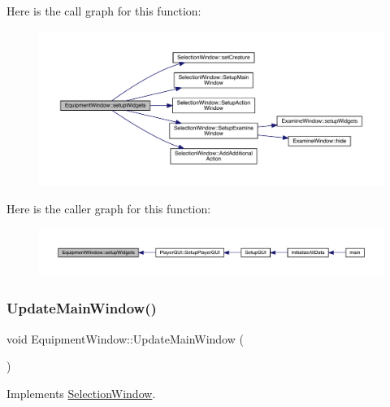 Here is the call graph for this function\+:
\nopagebreak
\begin{figure}[H]
\begin{center}
\leavevmode
\includegraphics[width=350pt]{d8/dcb/class_equipment_window_ad6ac175768f8725534c9b9ca1bd4d79a_cgraph}
\end{center}
\end{figure}
Here is the caller graph for this function\+:
\nopagebreak
\begin{figure}[H]
\begin{center}
\leavevmode
\includegraphics[width=350pt]{d8/dcb/class_equipment_window_ad6ac175768f8725534c9b9ca1bd4d79a_icgraph}
\end{center}
\end{figure}
\mbox{\label{class_equipment_window_acf7d2c5609224291b20ad65d1241eeca}} 
\subsubsection{\texorpdfstring{Update\+Main\+Window()}{UpdateMainWindow()}}
{\footnotesize\ttfamily void Equipment\+Window\+::\+Update\+Main\+Window (\begin{DoxyParamCaption}{ }\end{DoxyParamCaption})\hspace{0.3cm}{\ttfamily [virtual]}}



Implements \mbox{\hyperlink{class_selection_window_a4ccb50fc06840c6c3966c89b1d991b03}{Selection\+Window}}.

